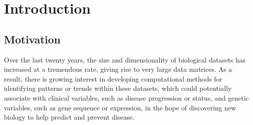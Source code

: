 %

\chapter[Introduction]{ \label{chapter:intro} Introduction}

\section{Motivation}

Over the last twenty years, the size and dimensionality of biological datasets has increased at a tremendous rate,
giving rise to very large data matrices.
As a result, there is growing interest in developing computational methods for identifying patterns or trends 
within these datasets, which could potentially associate with clinical variables, such as disease progression or status,
and genetic variables, such as gene sequence or expression, in the hope of discovering new biology
to help predict and prevent disease.

